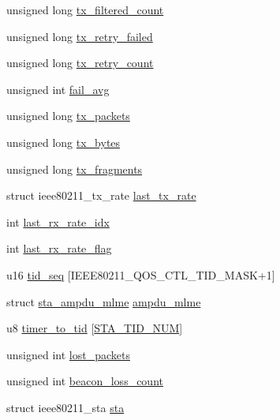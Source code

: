 \begin{DoxyCompactItemize}
unsigned long \hyperlink{structsta__info_a4ea3ebbcb6af9d8f4f401897d2d16f13}{tx\-\_\-filtered\-\_\-count}
\item 
unsigned long \hyperlink{structsta__info_af0a03540f21240022f46246dd3fd1136}{tx\-\_\-retry\-\_\-failed}
\item 
unsigned long \hyperlink{structsta__info_ac0325bffa5a0874c0f3f62ec77ddbadf}{tx\-\_\-retry\-\_\-count}
\item 
unsigned int \hyperlink{structsta__info_a2e8ebe1593e8bfdb0696ad9adbab7209}{fail\-\_\-avg}
\item 
unsigned long \hyperlink{structsta__info_a04c4bb1c42d342d7b70a79c91a7ab2b7}{tx\-\_\-packets}
\item 
unsigned long \hyperlink{structsta__info_a7639b5284b79992ec806f00466ee1f24}{tx\-\_\-bytes}
\item 
unsigned long \hyperlink{structsta__info_ad4530b03477a3a0603c240e67c163ab9}{tx\-\_\-fragments}
\item 
struct ieee80211\-\_\-tx\-\_\-rate \hyperlink{structsta__info_a0691fc258d91f737d761976ad8c96118}{last\-\_\-tx\-\_\-rate}
\item 
int \hyperlink{structsta__info_a91ccafb08a519aa4bd9efdd330b3d6a9}{last\-\_\-rx\-\_\-rate\-\_\-idx}
\item 
int \hyperlink{structsta__info_a3ce20e50f9c3e0019984f7fce388ff53}{last\-\_\-rx\-\_\-rate\-\_\-flag}
\item 
u16 \hyperlink{structsta__info_a51a374321b9b3f2f41ec59ed2dc0eca9}{tid\-\_\-seq} \mbox{[}I\-E\-E\-E80211\-\_\-\-Q\-O\-S\-\_\-\-C\-T\-L\-\_\-\-T\-I\-D\-\_\-\-M\-A\-S\-K+1\mbox{]}
\item 
struct \hyperlink{structsta__ampdu__mlme}{sta\-\_\-ampdu\-\_\-mlme} \hyperlink{structsta__info_ad42a305af8f3528d28546f33350e4473}{ampdu\-\_\-mlme}
\item 
u8 \hyperlink{structsta__info_ab892eac21bd848831f225404459d91ff}{timer\-\_\-to\-\_\-tid} \mbox{[}\hyperlink{sta__info_8h_a8376226f35c3c806965ac03355cc1a00}{S\-T\-A\-\_\-\-T\-I\-D\-\_\-\-N\-U\-M}\mbox{]}
\item 
unsigned int \hyperlink{structsta__info_ab7d0bdf10d99357afd115dd2c9926cb9}{lost\-\_\-packets}
\item 
unsigned int \hyperlink{structsta__info_a2d5a8a52432b6f6ab32bcb069ca3115a}{beacon\-\_\-loss\-\_\-count}
\item 
struct ieee80211\-\_\-sta \hyperlink{structsta__info_a10bf230d5f2e241e9de2a67c2da53d4e}{sta}
\end{DoxyCompactItemize}


